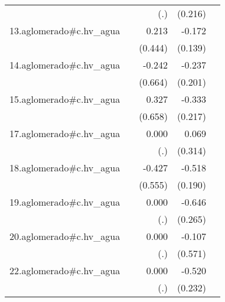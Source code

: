 {\begin{longtable}{l*{4}{D{.}{.}{-1}}}
            &                     &         (.)         &     (0.216)         &                     \\
\addlinespace
13.aglomerado#c.hv\_agua&                     &       0.213         &      -0.172         &                     \\
            &                     &     (0.444)         &     (0.139)         &                     \\
\addlinespace
14.aglomerado#c.hv\_agua&                     &      -0.242         &      -0.237         &                     \\
            &                     &     (0.664)         &     (0.201)         &                     \\
\addlinespace
15.aglomerado#c.hv\_agua&                     &       0.327         &      -0.333         &                     \\
            &                     &     (0.658)         &     (0.217)         &                     \\
\addlinespace
17.aglomerado#c.hv\_agua&                     &       0.000         &       0.069         &                     \\
            &                     &         (.)         &     (0.314)         &                     \\
\addlinespace
18.aglomerado#c.hv\_agua&                     &      -0.427         &      -0.518\sym{**} &                     \\
            &                     &     (0.555)         &     (0.190)         &                     \\
\addlinespace
19.aglomerado#c.hv\_agua&                     &       0.000         &      -0.646\sym{*}  &                     \\
            &                     &         (.)         &     (0.265)         &                     \\
\addlinespace
20.aglomerado#c.hv\_agua&                     &       0.000         &      -0.107         &                     \\
            &                     &         (.)         &     (0.571)         &                     \\
\addlinespace
22.aglomerado#c.hv\_agua&                     &       0.000         &      -0.520\sym{*}  &                     \\
            &                     &         (.)         &     (0.232)         &                     \\

\end{longtable}}
